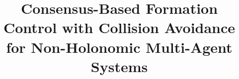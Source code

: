 \documentclass[conference]{IEEEtran}
\begin{document}
\title{Consensus-Based Formation Control with Collision Avoidance for Non-Holonomic Multi-Agent Systems}



\maketitle


















 
%
\end{document}
